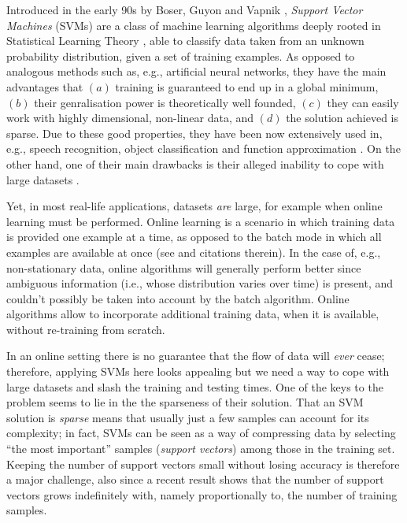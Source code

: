 Introduced in the early 90s by Boser, Guyon and Vapnik \cite{BGV92},
\emph{Support Vector Machines} (SVMs) are a class of machine learning
algorithms deeply rooted in Statistical Learning Theory
\cite{v-edbed-82}, able to classify data taken from an unknown
probability distribution, given a set of training examples. As opposed
to analogous methods such as, e.g., artificial neural networks, they
have the main advantages that $(a)$ training is guaranteed to end up
in a global minimum, $(b)$ their genralisation power is theoretically
well founded, $(c)$ they can easily work with highly dimensional,
non-linear data, and $(d)$ the solution achieved is sparse. Due to
these good properties, they have been now extensively used in, e.g.,
speech recognition, object classification and function approximation
\cite{Cristianini00}. On the other hand, one of their main drawbacks
is their alleged inability to cope with large datasets
\cite{KeerthiCDC06}.

Yet, in most real-life applications, datasets \emph{are} large, for
example when online learning must be performed. Online learning is a
scenario in which training data is provided one example at a time, as
opposed to the batch mode in which all examples are available at once
(see \cite{Laskov2006} and citations therein). In the case of, e.g.,
non-stationary data, online algorithms will generally perform better
since ambiguous information (i.e., whose distribution varies over
time) is present, and couldn't possibly be taken into account by the
batch algorithm. Online algorithms allow to incorporate additional
training data, when it is available, without re-training from scratch.

In an online setting there is no guarantee that the flow of data will
\emph{ever} cease; therefore, applying SVMs here looks appealing but
we need a way to cope with large datasets and slash the training and
testing times. One of the keys to the problem seems to lie in the the
sparseness of their solution. That an SVM solution is \emph{sparse}
means that usually just a few samples can account for its complexity;
in fact, SVMs can be seen as a way of compressing data by selecting
``the most important'' samples (\emph{support vectors}) among those in
the training set. Keeping the number of support vectors small without
losing accuracy is therefore a major challenge, also since a recent
result \cite{Steinwart03} shows that the number of support vectors
grows indefinitely with, namely proportionally to, the number of
training samples.

